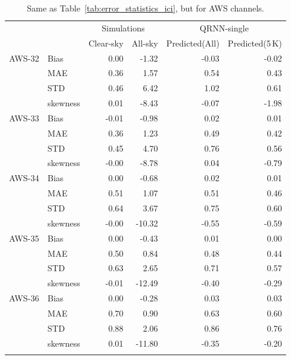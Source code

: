 \documentclass[amt]{copernicus}
\begin{document}
\begin{table}[t]
	\caption{Same as Table~\ref{tab:error_statistics_ici}, but for AWS channels. }
	\label{tab:statistics_qrnn_aws}
	\begin{tabular}{llrr|rr}
		\tophline
		&&\multicolumn{2}{c|}{Simulations}& \multicolumn{2}{c}{QRNN-single} \\
		\cline{3-6}
		&&   Clear-sky &   All-sky &   Predicted(All) & Predicted(5\,K) \\
		\middlehline
		AWS-32  &Bias     & 0.00 & -1.32 &  -0.03 & -0.02 \\
		&MAE      & 0.36 &  1.57 &   0.54 &  0.43 \\
		&STD      & 0.46 &  6.42 &   1.02 &  0.61 \\
		&skewness & 0.01 & -8.43 &  -0.07 & -1.98 \\
		\middlehline
		AWS-33	&Bias     & -0.01 & -0.98 &  0.02 &  0.01 \\
		&MAE      &  0.36 &  1.23 &  0.49 &  0.42 \\
		&STD      &  0.45 &  4.70 &  0.76 &  0.56 \\
		&skewness & -0.00 & -8.78 &  0.04 & -0.79 \\
		
		\middlehline
		AWS-34	&Bias     &  0.00 &  -0.68 &  0.02 &  0.01 \\
		&MAE      &  0.51 &   1.07 &  0.51 &  0.46 \\
		&STD      &  0.64 &   3.67 &  0.75 &  0.60 \\
		&skewness & -0.00 & -10.32 & -0.55 & -0.59 \\
		\middlehline
		AWS-35	&Bias     &  0.00 &  -0.43 &  0.01 &  0.00 \\
		&MAE      &  0.50 &   0.84 &  0.48 &  0.44 \\
		&STD      &  0.63 &   2.65 &  0.71 &  0.57 \\
		&skewness & -0.01 & -12.49 & -0.40 & -0.29 \\
		\middlehline
		AWS-36  &Bias     & 0.00 &  -0.28 &   0.03  &  0.03 \\
		&MAE      & 0.70 &   0.90 &   0.63  &  0.60 \\
		&STD      & 0.88 &   2.06 &   0.86  &  0.76 \\
		&skewness & 0.01 & -11.80 &  -0.35  & -0.20 \\
		\bottomhline				
	\end{tabular}
	\belowtable{} %
\end{table}
\end{document}
